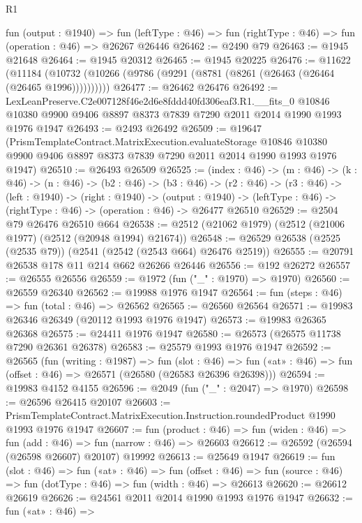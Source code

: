 \begin{lexlean}{R1}
\begin{coremodule}
  fun (output : @1940) =>
  fun (leftType : @46) => fun (rightType : @46) => fun (operation : @46) => @26267 @26446
@26462 := @2490 @79
@26463 := @1945 @21648
@26464 := @1945 @20312
@26465 := @1945 @20225
@26476 := @11622
    (@11184 (@10732 (@10266 (@9786 (@9291 (@8781 (@8261 (@26463 (@26464 (@26465 @1996))))))))))
@26477 := @26462 @26476
@26492 := LexLeanPreserve.C2e007128f46e2d6e8fddd40fd306eaf3.R1.__fits_0
    @10846
    @10380
    @9900
    @9406
    @8897
    @8373
    @7839
    @7290
    @2011
    @2014
    @1990
    @1993
    @1976
    @1947
@26493 := @2493 @26492
@26509 := @19647
    (PrismTemplateContract.MatrixExecution.evaluateStorage
      @10846
      @10380
      @9900
      @9406
      @8897
      @8373
      @7839
      @7290
      @2011
      @2014
      @1990
      @1993
      @1976
      @1947)
@26510 := @26493 @26509
@26525 := (index : @46) ->
  (m : @46) ->
  (k : @46) ->
  (n : @46) ->
  (b2 : @46) ->
  (b3 : @46) ->
  (r2 : @46) ->
  (r3 : @46) ->
  (left : @1940) ->
  (right : @1940) ->
  (output : @1940) -> (leftType : @46) -> (rightType : @46) -> (operation : @46) -> @26477 @26510
@26529 := @2504 @79 @26476 @26510 @664
@26538 := @2512 (@21062 @1979) (@2512 (@21006 @1977) (@2512 (@20948 @1994) @21674))
@26548 := @26529 @26538 (@2525 (@2535 @79)) (@2541 (@2542 (@2543 @664) @26476 @2519))
@26555 := @20791 @26538 @178 @11 @214 @662 @26266 @26446
@26556 := @192 @26272
@26557 := @26555 @26556
@26559 := @1972 (fun ("_" : @1970) => @1970)
@26560 := @26559 @26340
@26562 := @19988 @1976 @1947
@26564 := fun (steps : @46) => fun (total : @46) => @26562
@26565 := @26560 @26564
@26571 := @19983 @26346 @26349 (@20112 @1993 @1976 @1947)
@26573 := @19983 @26365 @26368
@26575 := @24411 @1976 @1947
@26580 := @26573 (@26575 @11738 @7290 @26361 @26378)
@26583 := @25579 @1993 @1976 @1947
@26592 := @26565
    (fun (writing : @1987) =>
    fun (slot : @46) =>
    fun («at» : @46) => fun (offset : @46) => @26571 (@26580 (@26583 @26396 @26398)))
@26594 := @19983 @4152 @4155
@26596 := @2049 (fun ("_" : @2047) => @1970)
@26598 := @26596 @26415 @20107
@26603 := PrismTemplateContract.MatrixExecution.Instruction.roundedProduct @1990 @1993 @1976 @1947
@26607 := fun (product : @46) =>
  fun (widen : @46) => fun (add : @46) => fun (narrow : @46) => @26603
@26612 := @26592 (@26594 (@26598 @26607) @20107) @19992
@26613 := @25649 @1947
@26619 := fun (slot : @46) =>
  fun («at» : @46) =>
  fun (offset : @46) => fun (source : @46) => fun (dotType : @46) => fun (width : @46) => @26613
@26620 := @26612 @26619
@26626 := @24561 @2011 @2014 @1990 @1993 @1976 @1947
@26632 := fun («at» : @46) =>

\end{coremodule}
\end{lexlean}
